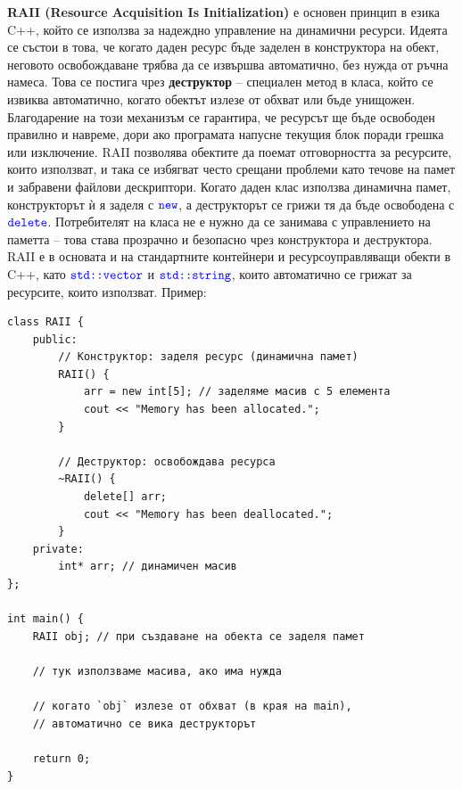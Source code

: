 \documentclass{article}
\begin{document}
\textbf{RAII (Resource Acquisition Is Initialization)} е основен принцип в езика C++, който се използва за надеждно управление на динамични ресурси.
Идеята се състои в това, че когато даден ресурс бъде заделен в конструктора на обект, неговото освобождаване трябва да се извършва автоматично,
без нужда от ръчна намеса. Това се постига чрез \textbf{деструктор} – специален метод в класа, който се извиква автоматично, когато обектът излезе
от обхват или бъде унищожен. Благодарение на този механизъм се гарантира, че ресурсът ще бъде освободен правилно и навреме, дори ако програмата напусне
текущия блок поради грешка или изключение. RAII позволява обектите да поемат отговорността за ресурсите, които използват, и така се избягват често
срещани проблеми като течове на памет и забравени файлови дескриптори.
Когато даден клас използва динамична памет, конструкторът ѝ я заделя с $\textcolor{blue}{\texttt{new}}$, а
деструкторът се грижи тя да бъде освободена с $\textcolor{blue}{\texttt{delete}}$. Потребителят на класа не е нужно да се занимава с управлението на паметта – това става
прозрачно и безопасно чрез конструктора и деструктора. RAII е в основата и на стандартните контейнери и ресурсоуправляващи обекти в C++, като
$\textcolor{blue}{\texttt{std::vector}}$ и $\textcolor{blue}{\texttt{std::string}}$, които автоматично се грижат за ресурсите, които използват. \newline\newline
Пример:
\begin{lstlisting}[style=cpp]
class RAII {
    public:
        // Конструктор: заделя ресурс (динамична памет)
        RAII() {
            arr = new int[5]; // заделяме масив с 5 елемента
            cout << "Memory has been allocated.";
        }
    
        // Деструктор: освобождава ресурса
        ~RAII() {
            delete[] arr;
            cout << "Memory has been deallocated.";
        }
    private:
        int* arr; // динамичен масив
};

int main() {
    RAII obj; // при създаване на обекта се заделя памет

    // тук използваме масива, ако има нужда

    // когато `obj` излезе от обхват (в края на main),
    // автоматично се вика деструкторът
    
    return 0;
}

\end{lstlisting}
\end{document}
